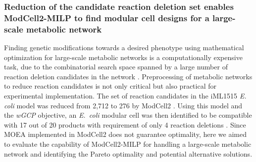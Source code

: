 \subsubsection{Reduction of the candidate reaction deletion set enables ModCell2-MILP to find modular cell designs for a large-scale metabolic network}

Finding genetic modifications towards a desired phenotype using mathematical optimization for large-scale metabolic networks is a computationally expensive task, due to the combinatorial search space spanned by a large number of reaction deletion candidates in the network \citep{feist2010, kamp2014}.
Preprocessing of metabolic networks to reduce reaction candidates is not only critical but also practical for experimental implementation. The set of reaction candidates in the iML1515 \textit{E. coli} model\citep{monk2017} was reduced from 2,712 to 276 by ModCell2 \citep{garcia2019}. Using this model and the \textit{wGCP} objective, an \textit{E.~coli} modular cell was then identified to be compatible with 17 out of 20 products with requirement of only 4 reaction deletions \citep{garcia2019}.
Since MOEA implemented in ModCell2 does not guarantee optimality, here we aimed to evaluate the capability of ModCell2-MILP for handling a large-scale metabolic network and identifying the Pareto optimality and potential alternative solutions.

